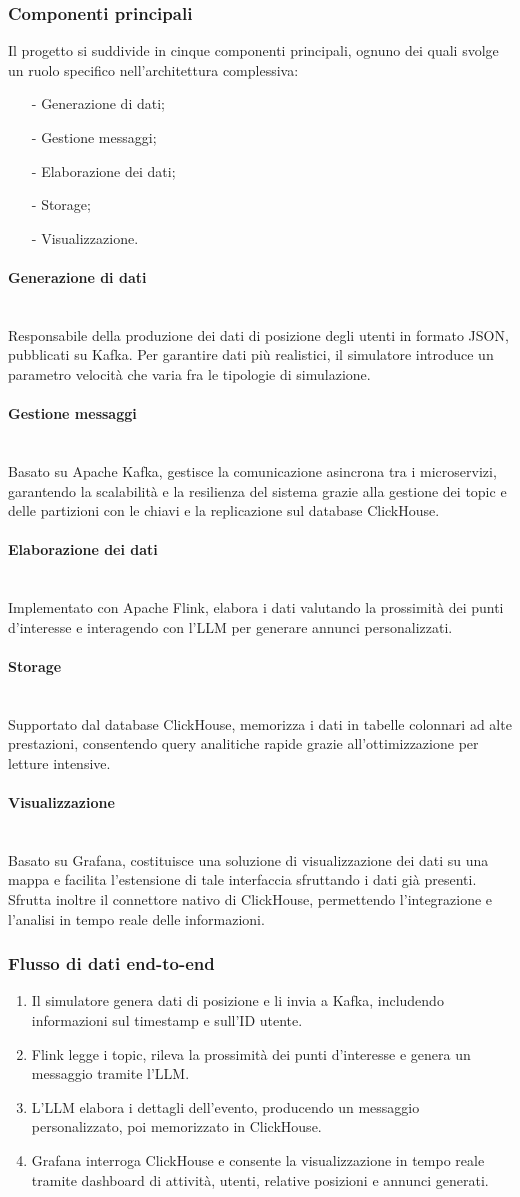 \documentclass[10pt]{article}
\newcommand{\myparagraph}[1]{\paragraph{#1}\mbox{}\\}
\begin{document}
\subsubsection{Componenti principali}
Il progetto si suddivide in cinque componenti principali, ognuno dei quali svolge un ruolo specifico nell'architettura complessiva:
\begin{itemize}
    \item[-] Generazione di dati;
    \item[-] Gestione messaggi;
    \item[-] Elaborazione dei dati;
    \item[-] Storage;
    \item[-] Visualizzazione.
\end{itemize}

\myparagraph{Generazione di dati}
Responsabile della produzione dei dati di posizione degli utenti in formato JSON, pubblicati su Kafka. 
Per garantire dati più realistici, il simulatore introduce un parametro velocità che varia fra le tipologie di simulazione.

\myparagraph{Gestione messaggi}
Basato su Apache Kafka, gestisce la comunicazione asincrona tra i microservizi, garantendo la scalabilità e la resilienza del sistema grazie alla gestione dei topic e delle partizioni con le chiavi e la replicazione sul database ClickHouse.

\myparagraph{Elaborazione dei dati}
Implementato con Apache Flink, elabora i dati valutando la prossimità dei punti d’interesse e interagendo con 
l’LLM per generare annunci personalizzati. 

\myparagraph{Storage}
Supportato dal database ClickHouse, memorizza i dati in tabelle colonnari ad alte prestazioni, consentendo query 
analitiche rapide grazie all’ottimizzazione per letture intensive. 

\myparagraph{Visualizzazione}
Basato su Grafana, costituisce una soluzione di visualizzazione dei dati su una mappa e facilita l'estensione di tale interfaccia sfruttando i dati già presenti. 
Sfrutta inoltre il connettore nativo di ClickHouse, permettendo l'integrazione e l'analisi in tempo reale delle informazioni.

\subsubsection{Flusso di dati end-to-end}
\begin{enumerate}
    \item Il simulatore genera dati di posizione e li invia a Kafka, includendo informazioni sul timestamp e sull’ID utente.
    \item Flink legge i topic, rileva la prossimità dei punti d’interesse e genera un messaggio tramite l'LLM.
    \item L’LLM elabora i dettagli dell’evento, producendo un messaggio personalizzato, poi memorizzato in ClickHouse.
    \item Grafana interroga ClickHouse e consente la visualizzazione in tempo reale tramite dashboard di attività, utenti, relative posizioni e annunci generati.
\end{enumerate}
\end{document}
